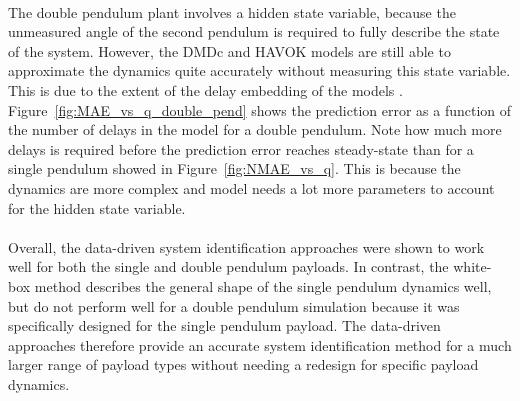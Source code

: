         
        
        \paragraph{}
        The double pendulum plant involves a hidden state variable, 
        because the unmeasured angle of the second pendulum 
        is required to fully describe the state of the system.
        However, the DMDc and HAVOK models are still able to approximate the dynamics quite accurately 
        without measuring this state variable.
        This is due to the extent of the delay embedding of the models \cite{Kamb2020}.
        Figure~\ref{fig:MAE_vs_q_double_pend} shows the prediction error 
        as a function of the number of delays in the model for a double pendulum.
        Note how much more delays is required before the prediction error reaches steady-state 
        than for a single pendulum showed in Figure~\ref{fig:NMAE_vs_q}.
        This is because the dynamics are more complex 
        and model needs a lot more parameters to account for the hidden state variable.
                
        

        \paragraph{}
        Overall, the data-driven system identification approaches were shown to work well 
        for both the single and double pendulum payloads.
        In contrast, the white-box method describes the general shape of the single pendulum dynamics well, 
        but do not perform well for a double pendulum simulation 
        because it was specifically designed for the single pendulum payload.
        The data-driven approaches therefore provide an accurate system identification method 
        for a much larger range of payload types without needing a redesign for specific payload dynamics.
        




